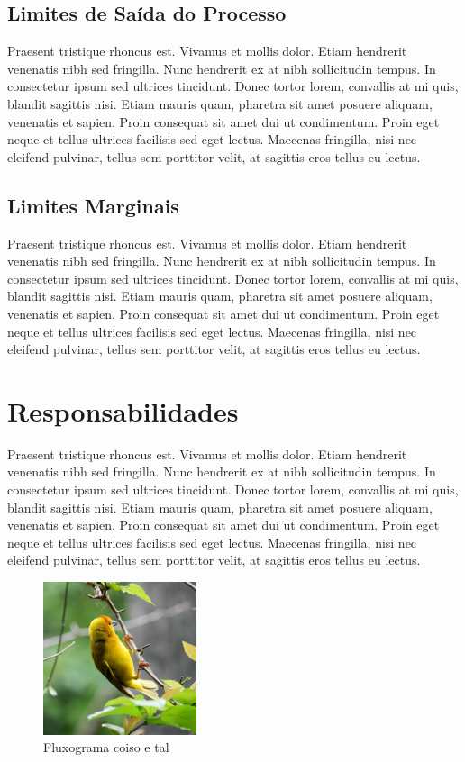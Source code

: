     \subsection{Limites de Saída do Processo}\label{subsec:limites-de-saida-do-processo}
    Praesent tristique rhoncus est. Vivamus et mollis dolor. Etiam hendrerit venenatis nibh sed fringilla. Nunc hendrerit ex at nibh sollicitudin tempus. In consectetur ipsum sed ultrices tincidunt. Donec tortor lorem, convallis at mi quis, blandit sagittis nisi. Etiam mauris quam, pharetra sit amet posuere aliquam, venenatis et sapien. Proin consequat sit amet dui ut condimentum. Proin eget neque et tellus ultrices facilisis sed eget lectus. Maecenas fringilla, nisi nec eleifend pulvinar, tellus sem porttitor velit, at sagittis eros tellus eu lectus.

    \subsection{Limites Marginais}\label{subsec:limites-marginais}
    Praesent tristique rhoncus est. Vivamus et mollis dolor. Etiam hendrerit venenatis nibh sed fringilla. Nunc hendrerit ex at nibh sollicitudin tempus. In consectetur ipsum sed ultrices tincidunt. Donec tortor lorem, convallis at mi quis, blandit sagittis nisi. Etiam mauris quam, pharetra sit amet posuere aliquam, venenatis et sapien. Proin consequat sit amet dui ut condimentum. Proin eget neque et tellus ultrices facilisis sed eget lectus. Maecenas fringilla, nisi nec eleifend pulvinar, tellus sem porttitor velit, at sagittis eros tellus eu lectus.

\section{Responsabilidades}\label{sec:responsabilidades}
Praesent tristique rhoncus est. Vivamus et mollis dolor. Etiam hendrerit venenatis nibh sed fringilla. Nunc hendrerit ex at nibh sollicitudin tempus. In consectetur ipsum sed ultrices tincidunt. Donec tortor lorem, convallis at mi quis, blandit sagittis nisi. Etiam mauris quam, pharetra sit amet posuere aliquam, venenatis et sapien. Proin consequat sit amet dui ut condimentum. Proin eget neque et tellus ultrices facilisis sed eget lectus. Maecenas fringilla, nisi nec eleifend pulvinar, tellus sem porttitor velit, at sagittis eros tellus eu lectus.

    \begin{figure}[htbp]
    \centering
    \includegraphics[width=0.4\textwidth]{exemplo/sample.jpeg}
    \caption{Fluxograma coiso e tal}
    \label{fig:fluxograma2}
    \end{figure}


